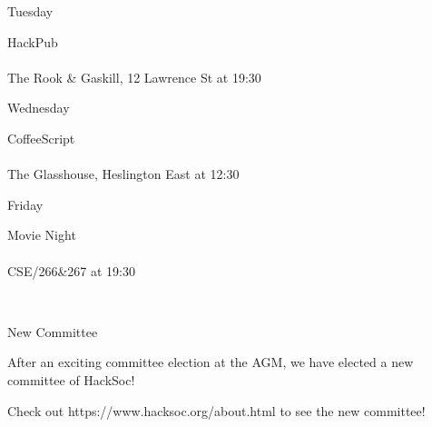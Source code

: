 \documentclass[14pt, landscape]{article}
\begin{document}
\begin{minipage}[t][17cm][t]{\textwidth}
\begin{multicols}{2}

\begin{minipage}{0.5\textwidth}{\fontsize{30}{40}\selectfont Tuesday}\\\vspace{0.2cm}\begin{addmargin}[1em]{0em}{\fontsize{24}{34}\selectfont \textcolor{emphasistext}{ HackPub }}\\\vspace{0.05cm}\\{\fontsize{20}{30}\selectfont The Rook \& Gaskill, 12 Lawrence St at 19:30 }\end{addmargin}\end{minipage}\vspace{0.75cm}
\begin{minipage}{0.5\textwidth}{\fontsize{30}{40}\selectfont Wednesday}\\\vspace{0.2cm}\begin{addmargin}[1em]{0em}{\fontsize{24}{34}\selectfont \textcolor{emphasistext}{ CoffeeScript }}\\\vspace{0.05cm}\\{\fontsize{20}{30}\selectfont The Glasshouse, Heslington East at 12:30 }\end{addmargin}\end{minipage}\vspace{0.75cm}
\begin{minipage}{0.5\textwidth}{\fontsize{30}{40}\selectfont Friday}\\\vspace{0.2cm}\begin{addmargin}[1em]{0em}{\fontsize{24}{34}\selectfont \textcolor{emphasistext}{ Movie Night }}\\\vspace{0.05cm}\\{\fontsize{20}{30}\selectfont CSE/266\&267 at 19:30 }\end{addmargin}\end{minipage}\vspace{0.75cm}
 \\
\begin{minipage}{0.45\textwidth}{\fontsize{30}{40}\selectfont New Committee
 }\\\begin{addmargin}[1em]{0em}{\fontsize{16}{20}\selectfont After an exciting committee election at the AGM, we have elected a new committee of HackSoc!
 \par}{\fontsize{16}{20}\selectfont Check out https://www.hacksoc.org/about.html to see the new committee!
 \par}\end{addmargin}\end{minipage} \\

\end{multicols}
\end{minipage}

\noindent\hdashrule[0cm]{39.5cm}{1pt}{2pt}
\end{document}
